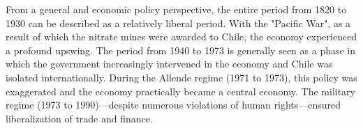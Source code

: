 \setmainfont{Lato-Light}
\fontsize{12pt}{17pt}\selectfont
\setlength{\columnsep}{1cm}
\begin{minipage}[t]{16.25cm}
\begin{multicols}{2} 
From a general and economic policy perspective, the entire period from
1820 to 1930 can be described as a relatively liberal period. With the
"Pacific War", as a result of which the nitrate mines were awarded to
Chile, the economy experienced a profound upswing. The period from
1940 to 1973 is generally seen as a phase in which the government
increasingly intervened in the economy and Chile was isolated
internationally. During the Allende regime (1971 to 1973), this policy
was exaggerated and the economy practically became a central
economy. The military regime (1973 to 1990)---despite numerous
violations of human rights---ensured liberalization of trade and
finance.
\end{multicols}
\end{minipage} 
